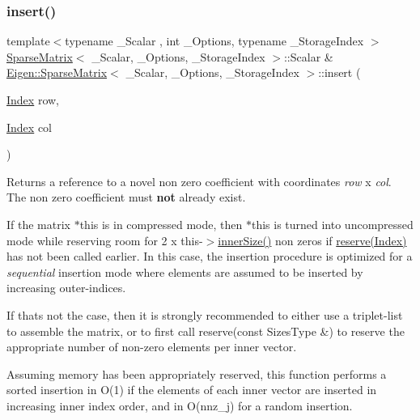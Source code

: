 \subsubsection{\texorpdfstring{insert()}{insert()}}
{\footnotesize\ttfamily template$<$typename \+\_\+\+Scalar , int \+\_\+\+Options, typename \+\_\+\+Storage\+Index $>$ \\
\mbox{\hyperlink{class_eigen_1_1_sparse_matrix}{Sparse\+Matrix}}$<$ \+\_\+\+Scalar, \+\_\+\+Options, \+\_\+\+Storage\+Index $>$\+::Scalar \& \mbox{\hyperlink{class_eigen_1_1_sparse_matrix}{Eigen\+::\+Sparse\+Matrix}}$<$ \+\_\+\+Scalar, \+\_\+\+Options, \+\_\+\+Storage\+Index $>$\+::insert (\begin{DoxyParamCaption}\item[{\mbox{\hyperlink{struct_eigen_1_1_eigen_base_a554f30542cc2316add4b1ea0a492ff02}{Index}}}]{row,  }\item[{\mbox{\hyperlink{struct_eigen_1_1_eigen_base_a554f30542cc2316add4b1ea0a492ff02}{Index}}}]{col }\end{DoxyParamCaption})}

\begin{DoxyReturn}{Returns}
a reference to a novel non zero coefficient with coordinates {\itshape row} x {\itshape col}. The non zero coefficient must {\bfseries{not}} already exist.
\end{DoxyReturn}
If the matrix {\ttfamily $\ast$this} is in compressed mode, then {\ttfamily $\ast$this} is turned into uncompressed mode while reserving room for 2 x this-\/$>$\mbox{\hyperlink{class_eigen_1_1_sparse_matrix_a0f42824d4a06ee1d1f6afbc4551c5896}{inner\+Size()}} non zeros if \mbox{\hyperlink{class_eigen_1_1_sparse_matrix_a1518e58ac49bed0e2385b722a034f7d3}{reserve(\+Index)}} has not been called earlier. In this case, the insertion procedure is optimized for a {\itshape sequential} insertion mode where elements are assumed to be inserted by increasing outer-\/indices.

If that\textquotesingle{}s not the case, then it is strongly recommended to either use a triplet-\/list to assemble the matrix, or to first call reserve(const Sizes\+Type \&) to reserve the appropriate number of non-\/zero elements per inner vector.

Assuming memory has been appropriately reserved, this function performs a sorted insertion in O(1) if the elements of each inner vector are inserted in increasing inner index order, and in O(nnz\+\_\+j) for a random insertion. \mbox{\label{class_eigen_1_1_sparse_matrix_a837934b33a80fe996ff20500373d3a61}} 

